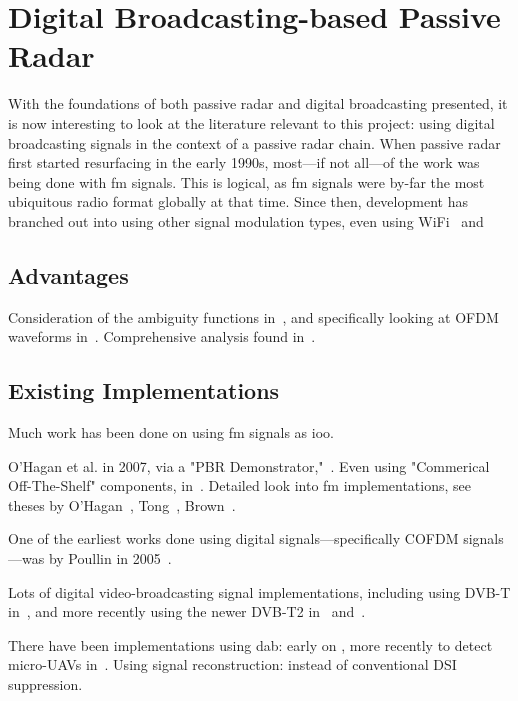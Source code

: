 \documentclass[class=report,11pt,crop=false]{standalone}
\begin{document}
\section{Digital Broadcasting-based Passive Radar}
With the foundations of both passive radar and digital broadcasting presented, it is now interesting to look at the literature relevant to this project: using digital broadcasting signals in the context of a passive radar chain. When passive radar first started resurfacing in the early 1990s, most---if not all---of the work was being done with \gls{fm} signals. This is logical, as \gls{fm} signals were by-far the most ubiquitous radio format globally at that time. Since then, development has branched out into using other signal modulation types, even using WiFi~\cite{Guo2008} and 

\subsection{Advantages}

Consideration of the ambiguity functions in~\cite{Griffithsa}, and specifically looking at OFDM waveforms in~\cite{Searle2014}. Comprehensive analysis found in~\cite{Malanowski2019}.

\subsection{Existing Implementations}
Much work has been done on using \gls{fm} signals as \gls{ioo}.

O'Hagan et al. in 2007, via a "PBR Demonstrator,"~\cite{OHagan2007}. Even using "Commerical Off-The-Shelf" components, in~\cite{Tong2015}. Detailed look into \gls{fm} implementations, see theses by O'Hagan~\cite{o2009passive}, Tong~\cite{tong2014}, Brown~\cite{brown2013fm}.

One of the earliest works done using digital signals---specifically COFDM signals---was by Poullin in 2005~\cite{Poullin2005}.

Lots of digital video-broadcasting signal implementations, including using DVB-T in~\cite{radmard2012feasibility, palmer2011overview,Peto2014}, and more recently using the newer DVB-T2 in~\cite{OHagan2018} and~\cite{Low2019}.

There have been implementations using \gls{dab}: early on \cite{Yardley2007,Coleman2008}, more recently to detect micro-UAVs in~\cite{Schupbach2017}.
Using signal reconstruction: \cite{ohagan2010dab} instead of conventional DSI suppression.
\end{document}
